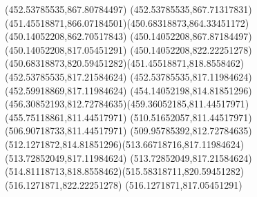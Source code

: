 {{	\lineto(452.53785535,867.80784497)
	\lineto(452.53785535,867.71317831)
	\curveto(451.45518871,866.07184501)(450.68318873,864.33451172)(450.14052208,862.70517843)
	\lineto(450.14052208,867.87184497)
	\closepath
	\moveto(450.14052208,817.05451291)
	\lineto(450.14052208,822.22251278)
	\curveto(450.68318873,820.59451282)(451.45518871,818.8558462)(452.53785535,817.21584624)
	\lineto(452.53785535,817.11984624)
	\lineto(452.59918869,817.11984624)
	\curveto(454.14052198,814.81851296)(456.30852193,812.72784635)(459.36052185,811.44517971)
	\lineto(455.75118861,811.44517971)
	\closepath
	\moveto(510.51652057,811.44517971)
	\lineto(506.90718733,811.44517971)
	\curveto(509.95785392,812.72784635)(512.1271872,814.81851296)(513.66718716,817.11984624)
	\lineto(513.72852049,817.11984624)
	\lineto(513.72852049,817.21584624)
	\curveto(514.81118713,818.8558462)(515.58318711,820.59451282)(516.1271871,822.22251278)
	\lineto(516.1271871,817.05451291)
	\closepath
}
}
{
}
